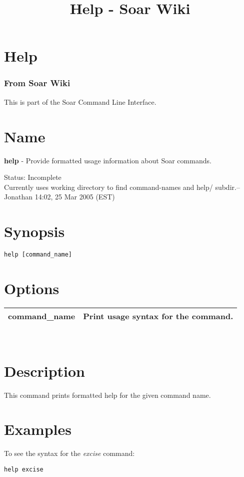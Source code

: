 \documentclass[10pt]{article}
\title{Help - Soar Wiki}
\begin{document}
\section*{Help}
\subsubsection*{From Soar Wiki}


 This is part of the Soar Command Line Interface. 
\section*{ Name }


 \textbf{help}
 - Provide formatted usage information about Soar commands. 


 Status: Incomplete\\ 
Currently uses working directory to find command-names and help/ subdir.--Jonathan 14:02, 25 Mar 2005 (EST) 
\section*{ Synopsis }
\begin{verbatim}
help [command_name]

\end{verbatim}
\section*{ Options }


\begin{tabular}{|p{1in}|p{5in}|}
\hline 
 command\_name  & Print usage syntax for the command.  \\
 \hline 

\end{tabular}



 \\ 

\section*{ Description }


 This command prints formatted help for the given command name. 
\section*{ Examples }


 To see the syntax for the \emph{excise}
 command: \begin{verbatim}
help excise

\end{verbatim}
\end{document}
